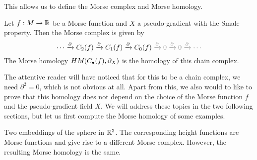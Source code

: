 This allows us to define the Morse complex and Morse homology.
\begin{definition}
    Let $f:M \to \mathbb{R}$ be a Morse function and $X$ a pseudo-gradient with the Smale property.
    Then the Morse complex is given by 
    \[
        \cdots \xrightarrow{\partial} C_2(f) \xrightarrow{\partial}  C_1(f) \xrightarrow{\partial} C_0(f) \textcolor{gray}{{} \xrightarrow{\partial}  0 \xrightarrow{\partial }0 \xrightarrow{\partial}  \cdots}
    \] 
    The Morse homology $HM_{}(C_\bullet(f), \partial_X)$ is the homology of this chain complex.
\end{definition}
The attentive reader will have noticed that for this to be a chain complex, we need $\partial^2 = 0$, which is not obvious at all.
Apart from this, we also would to like to prove that  this homology does not depend on the choice of the Morse function $f$ and the pseudo-gradient field $X$.
We will address these topics in the two following sections, but let us first compute the Morse homology of some examples.


\begin{marginfigure}
    \centering
    \caption{Two embeddings of the sphere in $\mathbb{R}^3$.
        The corresponding height functions are Morse functions and give rise to a different Morse complex.
        However, the resulting Morse homology is the same.
    }
    \label{fig:other-sphere-and-normal-sphere-morse-complex}
\end{marginfigure}

